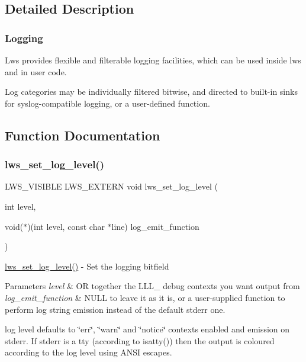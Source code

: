 \subsection{Detailed Description}
\subsubsection*{Logging}

Lws provides flexible and filterable logging facilities, which can be used inside lws and in user code.

Log categories may be individually filtered bitwise, and directed to built-\/in sinks for syslog-\/compatible logging, or a user-\/defined function. 

\subsection{Function Documentation}
\mbox{\label{group__log_ga244647f9e1bf0097ccdde66d74f41e26}} 
\subsubsection{\texorpdfstring{lws\+\_\+set\+\_\+log\+\_\+level()}{lws\_set\_log\_level()}}
{\footnotesize\ttfamily L\+W\+S\+\_\+\+V\+I\+S\+I\+B\+LE L\+W\+S\+\_\+\+E\+X\+T\+E\+RN void lws\+\_\+set\+\_\+log\+\_\+level (\begin{DoxyParamCaption}\item[{int}]{level,  }\item[{void($\ast$)(int level, const char $\ast$line)}]{log\+\_\+emit\+\_\+function }\end{DoxyParamCaption})}

\hyperlink{group__log_ga244647f9e1bf0097ccdde66d74f41e26}{lws\+\_\+set\+\_\+log\+\_\+level()} -\/ Set the logging bitfield 
\begin{DoxyParams}{Parameters}
{\em level} & OR together the L\+L\+L\+\_\+ debug contexts you want output from \\
\hline
{\em log\+\_\+emit\+\_\+function} & N\+U\+LL to leave it as it is, or a user-\/supplied function to perform log string emission instead of the default stderr one.\\
\hline
\end{DoxyParams}
log level defaults to \char`\"{}err\char`\"{}, \char`\"{}warn\char`\"{} and \char`\"{}notice\char`\"{} contexts enabled and emission on stderr. If stderr is a tty (according to isatty()) then the output is coloured according to the log level using A\+N\+SI escapes.

